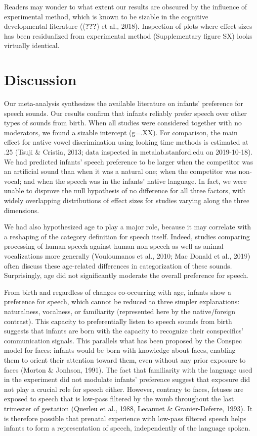 \documentclass[man]{apa6}
\begin{document}
Readers may wonder to what extent our results are obscured by the
influence of experimental method, which is known to be sizable in the
cognitive developmental literature (({\textbf{???}}) et al., 2018).
Inspection of plots where effect sizes has been residualized from
experimental method (Supplementary figure SX) looks virtually identical.

\section{Discussion}\label{discussion}

Our meta-analysis synthesizes the available literature on infants'
preference for speech sounds. Our results confirm that infants reliably
prefer speech over other types of sounds from birth. When all studies
were considered together with no moderators, we found a sizable
intercept (g=.XX). For comparison, the main effect for native vowel
discrimination using looking time methods is estimated at .25 (Tsuji \&
Cristia, 2013; data inspected in metalab.stanford.edu on 2019-10-18). We
had predicted infants' speech preference to be larger when the
competitor was an artificial sound than when it was a natural one; when
the competitor was non-vocal; and when the speech was in the infants'
native language. In fact, we were unable to disprove the null hypothesis
of no difference for all three factors, with widely overlapping
distributions of effect sizes for studies varying along the three
dimensions.

We had also hypothesized age to play a major role, because it may
correlate with a reshaping of the category definition for speech itself.
Indeed, studies comparing processing of human speech against human
non-speech as well as animal vocalizations more generally (Vouloumanos
et al., 2010; Mac Donald et al., 2019) often discuss these age-related
differences in categorization of these sounds. Surprisingly, age did not
significantly moderate the overall preference for speech.

From birth and regardless of changes co-occurring with age, infants show
a preference for speech, which cannot be reduced to three simpler
explanations: naturalness, vocalness, or familiarity (represented here
by the native/foreign contrast). This capacity to preferentially listen
to speech sounds from birth suggests that infants are born with the
capacity to recognize their conspecifics' communication signals. This
parallels what has been proposed by the Conspec model for faces: infants
would be born with knowledge about faces, enabling them to orient their
attention toward them, even without any prior exposure to faces (Morton
\& Jonhson, 1991). The fact that familiarity with the language used in
the experiment did not modulate infants' preference suggest that
exposure did not play a crucial role for speech either. However,
contrary to faces, fetuses are exposed to speech that is low-pass
filtered by the womb throughout the last trimester of gestation (Querleu
et al., 1988, Lecanuet \& Granier-Deferre, 1993). It is therefore
possible that prenatal experience with low-pass filtered speech helps
infants to form a representation of speech, independently of the
language spoken.
\end{document}
